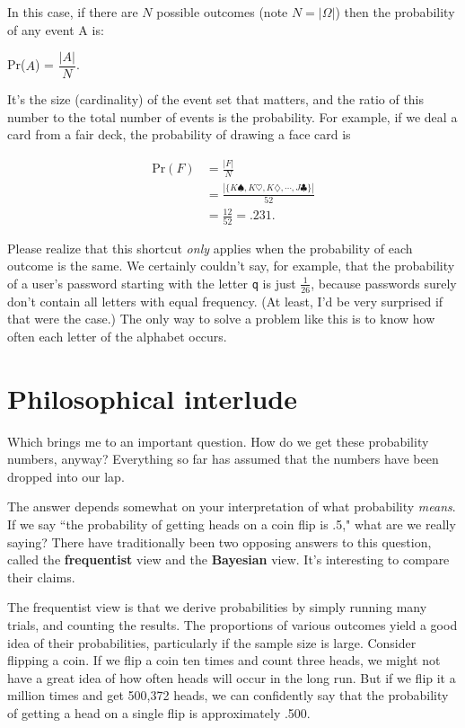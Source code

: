 In this case, if there are $N$ possible outcomes (note $N=|\Omega|$) then
the probability of any event A is:

\begin{center}
Pr($A$) = $\dfrac{|A|}{N}$.
\end{center}

It's the size (cardinality) of the event set that matters, and the ratio of
this number to the total number of events is the probability. For example,
if we deal a card from a fair deck, the probability of drawing a face card
is

\begin{align*}
\text{Pr}(F) &= \frac{|F|}{N} \\[.1in]
&= \frac{|\{K\spadesuit,K\heartsuit,K\diamondsuit,\cdots,J\clubsuit\}|}{52} \\[.1in]
&= \frac{12}{52} = .231.
\end{align*}

Please realize that this shortcut \textit{only} applies when the
probability of each outcome is the same. We certainly couldn't say, for
example, that the probability of a user's password starting with the letter
\texttt{q} is just $\frac{1}{26}$, because passwords surely don't contain
all letters with equal frequency. (At least, I'd be very surprised if that
were the case.) The only way to solve a problem like this is to know how
often each letter of the alphabet occurs.

\section{Philosophical interlude}

Which brings me to an important question. How do we get these probability
numbers, anyway? Everything so far has assumed that the numbers have been
dropped into our lap.

The answer depends somewhat on your interpretation of what probability
\textit{means}. If we say ``the probability of getting heads on a coin flip
is .5," what are we really saying? There have traditionally been two
opposing answers to this question, called the \textbf{frequentist} view and
the \textbf{Bayesian} view. It's interesting to compare their claims.

The frequentist view is that we derive probabilities by simply running many
trials, and counting the results. The proportions of various outcomes yield
a good idea of their probabilities, particularly if the sample size is
large. Consider flipping a coin. If we flip a coin ten times and count
three heads, we might not have a great idea of how often heads will occur
in the long run. But if we flip it a million times and get 500,372 heads,
we can confidently say that the probability of getting a head on a single
flip is approximately .500.

